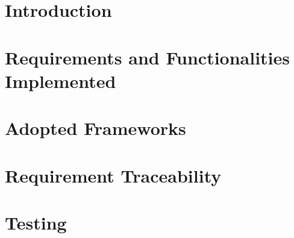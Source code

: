 \setcounter{page}{2}


\newpage
{}
\tableofcontents
\newpage
{}
\listoffigures
{}
\listoftables

\clearpage
\section{Introduction}
\label{sect:introduction}


\clearpage
\section{Requirements and Functionalities Implemented}
\label{sect:requirements_functions}


\clearpage
\section{Adopted Frameworks}
\label{sect:adopted_frameworks}


\clearpage
\section{Requirement Traceability}
\label{sect:source_structure}


\clearpage
\section{Testing}
\label{sect:testing}


